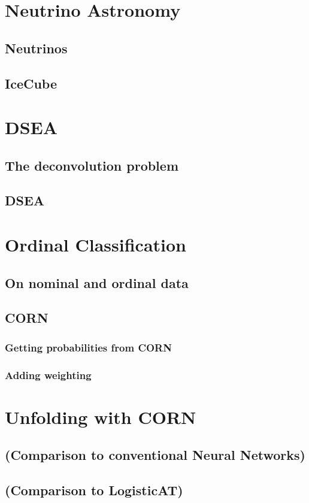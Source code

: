 
\chapter{Neutrino Astronomy}
     \section{Neutrinos}
     \section{IceCube}
\chapter{DSEA}
     \section{The deconvolution problem}
     \section{DSEA} %
\chapter{Ordinal Classification}
     \section{On nominal and ordinal data}
     \section{CORN}
          \subsection{Getting probabilities from CORN}
          \subsection{Adding weighting}
\chapter{Unfolding with CORN}
    
    
    \section{(Comparison to conventional Neural Networks)}
    \section{(Comparison to LogisticAT)}

